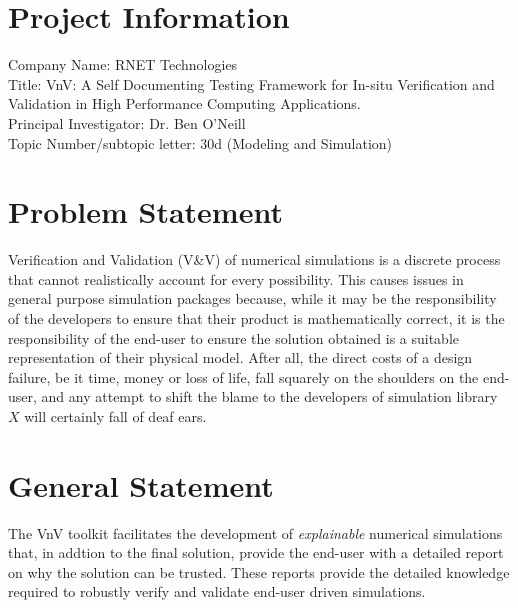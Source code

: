 
\section*{Project Information}
Company Name: RNET Technologies\\
Title: VnV: A Self Documenting Testing Framework for In-situ Verification and Validation in High Performance Computing Applications. \\
Principal Investigator: Dr. Ben O'Neill\\
Topic Number/subtopic letter: 30d (Modeling and Simulation)

\section*{Problem Statement}
Verification and Validation (V\&V) of numerical simulations is a discrete process that cannot realistically account for every possibility. This causes issues in general purpose simulation packages because, while it may be the responsibility of the developers to ensure that their product is mathematically correct, it is the responsibility of the end-user to ensure the solution obtained is a suitable representation of their physical model. After all, the direct costs of a design failure, be it time, money or loss of life, fall squarely on the shoulders on the end-user, and any attempt to shift the blame to the developers of simulation library $X$ will certainly fall of deaf ears. 
\section*{General Statement}
The VnV toolkit facilitates the development of \emph{explainable} numerical simulations that, in addtion to the final solution, provide 
the end-user with a detailed report on why the solution can be trusted. These reports provide the detailed knowledge
required to robustly verify and validate end-user driven simulations.

